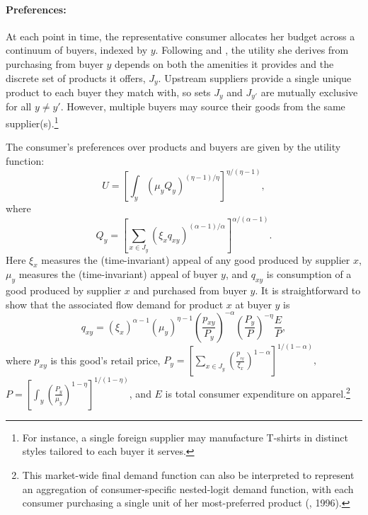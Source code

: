 \documentclass[12pt]{article} \usepackage{amsmath,amssymb,amsthm,geometry,graphicx,setspace,algorithm,algpseudocode,float}
\begin{document}
\paragraph{Preferences:} At each point in time, the representative consumer allocates her budget across a continuum of buyers, indexed by $y$. Following \citet{AtkinFaberGonzalez2018} and \citet{HottmanReddingWeinstein2015}, the utility she derives from purchasing from buyer $y$ depends on both the amenities it provides and the discrete set of products it offers, $J_y$. Upstream suppliers provide a single unique product to each buyer they match with, so sets $J_y$ and $J_{y'}$ are mutually exclusive for all $y \ne y'$. However, multiple buyers may source their goods from the same supplier(s).\footnote{For instance, a single foreign supplier may manufacture T-shirts in distinct styles tailored to each buyer it serves.\medskip} 
\par
The consumer's preferences over products and buyers are given by the utility function:%
\begin{equation*}
U=\left[ \int_{y}\left( \mu _{y}Q_{y}\right) ^{(\eta -1)/\eta}%
\right] ^{\eta/(\eta -1)},
\end{equation*}%
where 
\begin{equation*}
Q_{y}=\left[ \sum_{x\in J_y}\left( \xi _{x}q_{xy}\right) ^{(\alpha
-1)/\alpha}\right] ^{\alpha/(\alpha -1)}.
\end{equation*}%
Here $\xi_{x}$ measures the (time-invariant) appeal of any good produced by supplier $x$, $\mu_y$ measures the (time-invariant) appeal of buyer $y$, and $q_{xy}$ is consumption of a good produced by supplier $x$ and purchased from buyer $y$. It is straightforward to show that
 the associated flow demand for product $x$ at buyer $y$ is \begin{equation}
 \label{consumer_demand}
q_{xy}=\left( \xi _{x}\right) ^{\alpha -1}\left( \mu _{y}\right) ^{\eta
-1}\left( \frac{p_{xy}}{P_{y}}\right) ^{-\alpha }\left( \frac{P_{y}}{P}%
\right) ^{-\eta }\frac{E}{P},
\end{equation} where $p_{xy}$ is this good's retail price, 
$P_{y}=%
\left[ \sum_{x\in J_y}\left( \frac{p_{_{xy}}}{\xi _{x}}\right) ^{1-\alpha }%
\right] ^{1/(1-\alpha)},$
$ P=\left[ \int_{y}\left( \frac{P_{y}}{\mu _{y}}\right) ^{1-\eta } \right] ^{1/(1-\eta)}$,
and $E$ is total consumer expenditure on apparel.\footnote{This market-wide final demand function can also be interpreted to represent an aggregation of consumer-specific nested-logit demand function, with each consumer purchasing a single unit of her most-preferred product (\citeauthor{Verboven1996}, 1996).\medskip}
\end{document}
